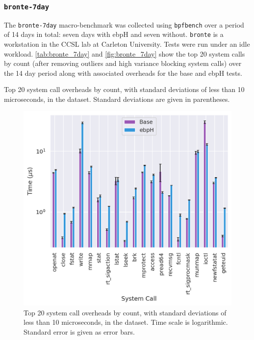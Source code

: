 \documentclass[
  12pt]{findlay}
\newcommand{\passthrough}[1]{#1}
\begin{document}
\hypertarget{bronte-7day}{%
\subsubsection{\texorpdfstring{\texttt{bronte-7day}}{bronte-7day}}\label{bronte-7day}}

\label{bronte_7day}

The \passthrough{\lstinline!bronte-7day!} macro-benchmark was collected
using \passthrough{\lstinline!bpfbench!} over a period of 14 days in
total: seven days with ebpH and seven without.
\passthrough{\lstinline!bronte!} is a workstation in the CCSL lab at
Carleton University. Tests were run under an idle workload.
\autoref{tab:bronte_7day} and \autoref{fig:bronte_7day} show the top 20
system calls by count (after removing outliers and high variance
blocking system calls) over the 14 day period along with associated
overheads for the base and ebpH tests.

\begin{table}
    \caption[Top 20 system call overheads by count in the  dataset]{
        Top 20 system call overheads by count, with standard deviations of less than 10 microseconds,
        in the  dataset.
        Standard deviations are given in parentheses.
    }
    \label{tab:bronte_7day}
    \resizebox{\columnwidth}{!}{
    
    }
\end{table}

\begin{figure}
    \caption[Top 20 system call overheads by count in the  dataset]{
        Top 20 system call overheads by count, with standard deviations of less than 10 microseconds,
        in the  dataset. Time scale is logarithmic. Standard error is given as error bars.
    }
    \label{fig:bronte_7day}
    \includegraphics[width=.8\textwidth]{../data/bench/bronte-7day/bronte_7day_times.png}
\end{figure}
\end{document}
